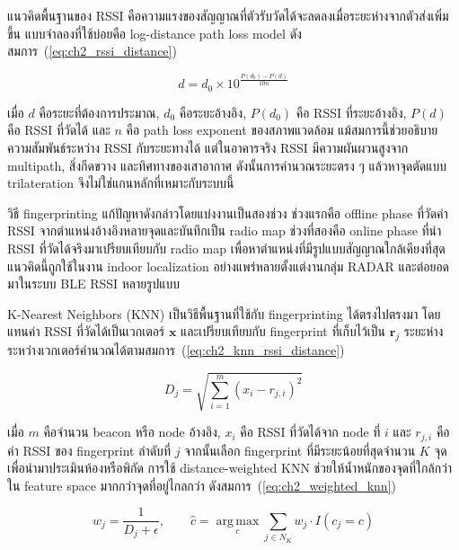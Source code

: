 แนวคิดพื้นฐานของ RSSI คือความแรงของสัญญาณที่ตัวรับวัดได้จะลดลงเมื่อระยะห่างจากตัวส่งเพิ่มขึ้น แบบจำลองที่ใช้บ่อยคือ log-distance path loss model ดังสมการ~(\ref{eq:ch2_rssi_distance}) \cite{Kaemarungsi2012RSSIAnalysis}

\begin{equation}
    d = d_0 \times 10^{\frac{P(d_0)-P(d)}{10n}}
    \label{eq:ch2_rssi_distance}
\end{equation}

เมื่อ $d$ คือระยะที่ต้องการประมาณ, $d_0$ คือระยะอ้างอิง, $P(d_0)$ คือ RSSI ที่ระยะอ้างอิง, $P(d)$ คือ RSSI ที่วัดได้ และ $n$ คือ path loss exponent ของสภาพแวดล้อม แม้สมการนี้ช่วยอธิบายความสัมพันธ์ระหว่าง RSSI กับระยะทางได้ แต่ในอาคารจริง RSSI มีความผันผวนสูงจาก multipath, สิ่งกีดขวาง และทิศทางของเสาอากาศ ดังนั้นการคำนวณระยะตรง ๆ แล้วหาจุดตัดแบบ trilateration จึงไม่ใช่แกนหลักที่เหมาะกับระบบนี้

วิธี fingerprinting แก้ปัญหาดังกล่าวโดยแบ่งงานเป็นสองช่วง ช่วงแรกคือ offline phase ที่วัดค่า RSSI จากตำแหน่งอ้างอิงหลายจุดและบันทึกเป็น radio map ช่วงที่สองคือ online phase ที่นำ RSSI ที่วัดได้จริงมาเปรียบเทียบกับ radio map เพื่อหาตำแหน่งที่มีรูปแบบสัญญาณใกล้เคียงที่สุด แนวคิดนี้ถูกใช้ในงาน indoor localization อย่างแพร่หลายตั้งแต่งานกลุ่ม RADAR และต่อยอดมาในระบบ BLE RSSI หลายรูปแบบ \cite{Bahl2000RADAR}

K-Nearest Neighbors (KNN) เป็นวิธีพื้นฐานที่ใช้กับ fingerprinting ได้ตรงไปตรงมา โดยแทนค่า RSSI ที่วัดได้เป็นเวกเตอร์ $\mathbf{x}$ และเปรียบเทียบกับ fingerprint ที่เก็บไว้เป็น $\mathbf{r}_j$ ระยะห่างระหว่างเวกเตอร์คำนวณได้ตามสมการ~(\ref{eq:ch2_knn_rssi_distance}) \cite{Cover1967NearestNeighbor}

\begin{equation}
    D_j = \sqrt{\sum_{i=1}^{m}(x_i-r_{j,i})^2}
    \label{eq:ch2_knn_rssi_distance}
\end{equation}

เมื่อ $m$ คือจำนวน beacon หรือ node อ้างอิง, $x_i$ คือ RSSI ที่วัดได้จาก node ที่ $i$ และ $r_{j,i}$ คือค่า RSSI ของ fingerprint ลำดับที่ $j$ จากนั้นเลือก fingerprint ที่มีระยะน้อยที่สุดจำนวน $K$ จุด เพื่อนำมาประเมินห้องหรือพิกัด การใช้ distance-weighted KNN ช่วยให้น้ำหนักของจุดที่ใกล้กว่าใน feature space มากกว่าจุดที่อยู่ไกลกว่า ดังสมการ~(\ref{eq:ch2_weighted_knn})

\begin{equation}
    w_j = \frac{1}{D_j+\epsilon}, \qquad
    \hat{c} = \operatorname*{arg\,max}_{c} \sum_{j \in N_K} w_j \cdot I(c_j=c)
    \label{eq:ch2_weighted_knn}
\end{equation}

